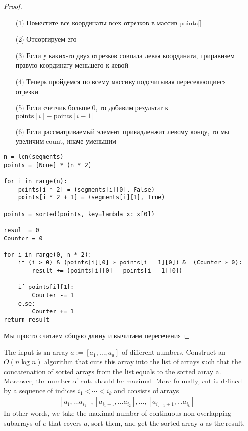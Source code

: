 \begin{proof}
\begin{itemize}
\item[]
\item[(1)] Поместите все координаты всех отрезков в массив points[]
\item[(2)] Отсортируем его
\item[(3)] Если у каких-то двух отрезков совпала левая координата, приравняем правую координату меньшего к левой
\item[(4)] Теперь пройдемся по всему массиву подсчитывая пересекающиеся отрезки
\item[(5)] Если счетчик больше 0, то добавим результат к $\text{points} [i] - \text{points} [i-1] $ 
\item[(6)] Если рассматриваемый элемент принадленжит левому концу, то мы увеличим count, иначе уменьшим
\end{itemize}
\vskip 0.2in
\begin{lstlisting}
n = len(segments)
points = [None] * (n * 2)
 
for i in range(n):
    points[i * 2] = (segments[i][0], False)
    points[i * 2 + 1] = (segments[i][1], True)
     
points = sorted(points, key=lambda x: x[0])
 
result = 0
Counter = 0
 
for i in range(0, n * 2):
    if (i > 0) & (points[i][0] > points[i - 1][0]) &  (Counter > 0):
        result += (points[i][0] - points[i - 1][0])
         
    if points[i][1]:
        Counter -= 1
    else:
        Counter += 1
return result
\end{lstlisting}
Мы просто считаем общую длину и вычитаем пересечения
\end{proof}
\newpage




\begin{prob}
The input is an array $a:=\left[a_1, \ldots, a_n\right]$ of different numbers. Construct an $O(n \log n)$ algorithm that cuts this array into the list of arrays such that the concatenation of sorted arrays from the list equals to the sorted array a. Moreover, the number of cuts should be maximal. More formally, cut is defined by a sequence of indices $i_1<\cdots<i_k$ and consists of arrays
\begin{gather*}
    \left[a_1, \ldots a_{i_1}\right],\left[a_{i_1+1}, \ldots a_{i_2}\right], \ldots,\left[a_{i_{k-1}+1}, \ldots a_{i_k}\right]
\end{gather*}
In other words, we take the maximal number of continuous non-overlapping subarrays of $a$ that covers $a$, sort them, and get the sorted array $a$ as the result.
\end{prob}


